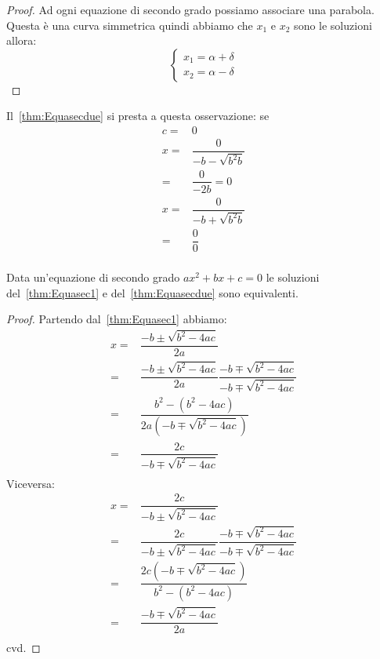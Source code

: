 \begin{proof}
	Ad ogni equazione di secondo grado possiamo associare una parabola. Questa  
	è una curva simmetrica quindi abbiamo che $x_1$ e $x_2$ sono le soluzioni 
	allora:\begin{equation}\label{eqn:Equasectre}
		\left\{\begin{array}{l}
			x_1=\alpha+\delta\\
			x_2=\alpha-\delta
		\end{array}\right.
	\end{equation}
\end{proof}
\begin{commento}
	Il~\vref{thm:Equasecdue} si presta a questa osservazione: se
	\begin{align*}
		c=&0\\
		x=&\dfrac{0}{-b-\sqrt{b^2b}}\\
		=&\dfrac{0}{-2b}=0\\
		x=&\dfrac{0}{-b+\sqrt{b^2b}}\\
		=&\dfrac{0}{0}\\
	\end{align*}
\end{commento}
\begin{thm}[Equivalenza]
	Data un'equazione di secondo grado $ax^2+bx+c=0$ le soluzioni 
	del~\vref{thm:Equasec1} e del~\vref{thm:Equasecdue} sono equivalenti.
\end{thm}
\begin{proof}
	Partendo dal~\vref{thm:Equasec1} abbiamo:
	\begin{align*}
	 x=&\dfrac{-b\pm\sqrt{b^2-4ac}}{2a}\\
	=&\dfrac{-b\pm\sqrt{b^2-4ac}}{2a}\dfrac{-b\mp\sqrt{b^2-4ac}}{-b\mp\sqrt{b^2-4ac}}\\
	=&\dfrac{b^2-(b^2-4ac)}{2a(-b\mp\sqrt{b^2-4ac})}\\
	=&\dfrac{2c}{-b\mp\sqrt{b^2-4ac}}\\
	\end{align*}
Viceversa:
\begin{align*}
	x=&\dfrac{2c}{-b\pm\sqrt{b^2-4ac}}\\
	=&\dfrac{2c}{-b\pm\sqrt{b^2-4ac}}\dfrac{-b\mp\sqrt{b^2-4ac}}{-b\mp\sqrt{b^2-4ac}}\\
	=&\dfrac{2c(-b\mp\sqrt{b^2-4ac})}{b^2-(b^2-4ac)}\\
	=&\dfrac{-b\mp\sqrt{b^2-4ac}}{2a}\\
\end{align*}
cvd.
\end{proof}

